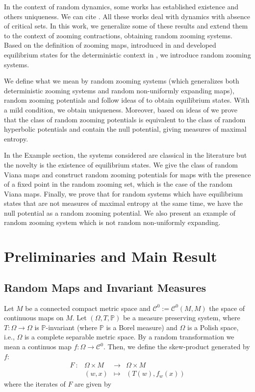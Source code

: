 \documentclass[12pt,a4paper]{amsart}
\theoremstyle{plain}
\begin{document}
	In the context of random dynamics, some works has established existence and others uniqueness. We can cite \cite{AMO,BR,K,SSV}. All these works deal with dynamics with absence of critical sets. In this work, we generalize some of these results and extend them to the context of zooming contractions, obtaining random zooming systems. Based on the definition of zooming maps, introduced in \cite{Pi1} and developed equilibrium states for the deterministic context in \cite{S}, we introduce random zooming systems. 
	
	
	We define what we mean by random zooming systems (which generalizes both deterministic zooming systems and random non-uniformly expanding maps), random zooming potentials and follow ideas of \cite{AMO} to obtain equilibrium states. With a mild condition, we obtain uniqueness. Moreover, based on ideas of \cite{S} we prove that the class of random zooming potentials is equivalent to the class of random hyperbolic potentials and contain the null potential, giving measures of maximal entropy.
	
	In the Example section, the systems considered are classical in the literature but the novelty is the existence of equilibrium states. We give the class of random Viana maps and construct random zooming potentials for maps with the presence of a fixed point in the random zooming set, which is the case of the random Viana maps. Finally, we prove that for random systems which have equilibrium states that are not measures of maximal entropy at the same time, we have the null potential as a random zooming potential.
	We also present an example of random zooming system which is not random non-uniformly expanding.
	\section{Preliminaries and Main Result}
	
	
	\subsection{Random Maps and Invariant Measures}
	
	Let $M$ be a connected compact metric space and $\mathcal{C}^{0}:=\mathcal{C}^{0}(M,M)$ the space of continuous maps on $M$. Let $(\Omega,T,\mathbb{P})$ be a measure preserving system, where $T : \Omega \to \Omega$ is $\mathbb{P}$-invariant (where $\mathbb{P}$ is a Borel measure) and $\Omega$ is a Polish space, i.e., $\Omega$ is a complete separable metric space. By a random transformation we mean a continuos map $f: \Omega \to \mathcal{C}^0$. Then, we define the skew-product generated by $f$:
	$$  
	\begin{array}{cccc}
		F \ : & \! \Omega \times M & \! \longrightarrow
		& \! \Omega \times M \\
		& \! (w,x) & \! \longmapsto
		& \! (T(w),f_{w}(x)) 
	\end{array}
	$$
	where the iterates of $F$ are given by 
	
\end{document}
